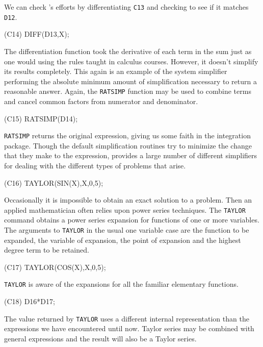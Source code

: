 We can check {\Macsyma}'s efforts by differentiating {\tt C13} and checking
to see if it matches {\tt D12}.
\begin{code}
(C14) DIFF(D13,X);
\end{code}
The differentiation function took the derivative of each term in the
sum just as one would using the rules taught in calculus courses.
However, it doesn't simplify its results completely.  This again is an
example of the system simplifier performing the absolute minimum
amount of simplification necessary to return a reasonable answer.
Again, the {\tt RATSIMP} function may be used to combine terms and cancel
common factors from numerator and denominator.
\begin{code}
(C15) RATSIMP(D14);
\end{code}

{\tt RATSIMP} returns the original expression, giving us some faith in
the integration package.  Though the default simplification routines
try to minimize the change that they make to the expression, {\Macsyma}
provides a large number of different simplifiers for dealing with the
different types of problems that arise.

\begin{code}
(C16) TAYLOR(SIN(X),X,0,5);
\end{code}
Occasionally it is impossible to obtain an exact solution to 
a problem.  Then an applied mathematician often relies upon
power series techniques.  
The {\tt TAYLOR} command obtains a power series expansion for functions of
one or more variables.  The arguments to {\tt TAYLOR} in the usual one variable
case are the function to be expanded, the variable of expansion, the point of
expansion and the highest degree term to be retained.
\begin{code}
(C17) TAYLOR(COS(X),X,0,5);
\end{code}
{\tt TAYLOR} is aware of the expansions for all the familiar elementary
functions.
\begin{code}
(C18) D16*D17;
\end{code}
The value returned by {\tt TAYLOR} uses a different internal representation
than the expressions we have encountered until now.  Taylor series may be
combined with general expressions and the result will also be a Taylor
series.

